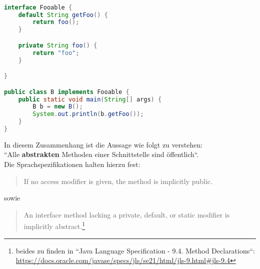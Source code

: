 \begin{lstlisting}[language=java]

interface Fooable {
    default String getFoo() {
        return foo();
    }

    private String foo() {
        return "foo";
    }

}

public class B implements Fooable {
    public static void main(String[] args) {
        B b = new B();
        System.out.println(b.getFoo());
    }
}

\end{lstlisting}

In diesem Zusammenhang  ist die Aussage wie folgt zu verstehen:\\

``Alle \textbf{abstrakten} Methoden einer Schnittstelle sind öffentlich``.\\

Die Sprachspezifikationen halten hierzu fest:
\blockquote{
    If no access modifier is given, the method is implicitly public.
}
sowie
\blockquote{
    An interface method lacking a private, default, or static modifier is implicitly abstract.\footnote{
    beides zu finden in  ``Java Language Specification - 9.4. Method Declarations``: \url{https://docs.oracle.com/javase/specs/jls/se21/html/jls-9.html#jls-9.4}
    }
}